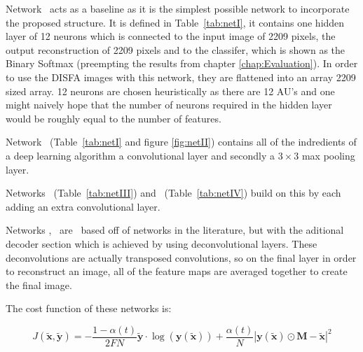 
    Network \networkI\, acts as a baseline as it is the simplest
    possible network to incorporate the proposed structure. It is defined in Table~\ref{tab:netI},
    it contains one hidden layer of 12 neurons which is connected to the input image of 2209 pixels,
    the output reconstruction of 2209 pixels and to the classifer, which is shown as the Binary Softmax
    (preempting the results from chapter \ref{chap:Evaluation}). In order to
    use the DISFA images with this network, they are flattened into an array 2209 sized array.
    12 neurons
    are chosen heuristically as there are 12 AU's and one might naively hope that the number of
    neurons required in the hidden layer would be roughly equal to the number of features.

    Network \networkII\ (Table~\ref{tab:netI} and figure \ref{fig:netII}) contains all of the indredients of a deep learning
    algorithm a convolutional layer and secondly a $3\times 3$ max pooling layer.

    Networks \networkIII\ (Table~\ref{tab:netIII}) and \networkIV\ (Table~\ref{tab:netIV})
    build on this by each adding an extra convolutional layer.

    Networks \networkII, \networkIII\ are \networkIV\ based off of networks in
    the literature, but with the aditional decoder section which is achieved by
    using deconvolutional layers. These deconvolutions are actually transposed
    convolutions, so on the final layer in order to reconstruct an image, all of
    the feature maps are averaged together to create
    the final image.

    The cost function of these networks is:

    \begin{equation} \label{eq:l2_cost_model}
        J(\tilde{\mathbf{x}},\tilde{\mathbf{y}}) = -\frac{1-\alpha(t)}{2FN}\tilde{\mathbf{y}}\cdot\log(\mathbf{y}(\tilde{\mathbf{x}}))
        + \frac{\alpha(t)}{N}\left |\mathbf{y}(\tilde{\mathbf{x}}) \odot \mathbf{M}-\tilde{\mathbf{x}}\right | ^2
    \end{equation}

